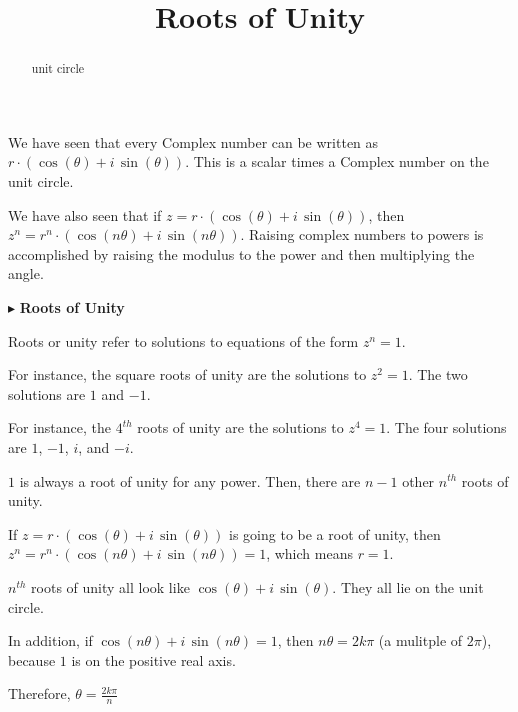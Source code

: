 \documentclass{ximera}
\title{Roots of Unity}
\begin{document}
\begin{abstract}
unit circle
\end{abstract}
\maketitle




We have seen that every Complex number can be written as $r \cdot (\cos(\theta) + i \, \sin(\theta))$.  This is a scalar times a Complex number on the unit circle.

We have also seen that if $z = r \cdot (\cos(\theta) + i \, \sin(\theta))$, then $z^n = r^n \cdot (\cos(n\theta) + i \, \sin(n\theta))$. Raising complex numbers to powers is accomplished by raising the modulus to the power and then multiplying the angle.


$\blacktriangleright$  \textbf{Roots of Unity}

Roots or unity refer to solutions to equations of the form $z^n = 1$.




For instance, the square roots of unity are the solutions to $z^2 = 1$.  The two solutions are $1$ and $-1$.


For instance, the $4^{th}$ roots of unity are the solutions to $z^4 = 1$.  The four solutions are $1$, $-1$, $i$, and $-i$.




$1$ is always a root of unity for any power. Then, there are $n-1$ other $n^{th}$ roots of unity.



If $z = r \cdot (\cos(\theta) + i \, \sin(\theta))$ is going to be a root of unity, then $z^n = r^n \cdot (\cos(n\theta) + i \, \sin(n\theta)) = 1$, which means $r=1$.

$n^{th}$ roots of unity all look like $\cos(\theta) + i \, \sin(\theta)$.  They all lie on the unit circle.



In addition, if $\cos(n\theta) + i \, \sin(n\theta) = 1$, then $n \theta = 2 k \pi$ (a mulitple of $2 \pi$), because $1$ is on the positive real axis.


Therefore, $\theta = \frac{2 k \pi}{n}$  
\end{document}
